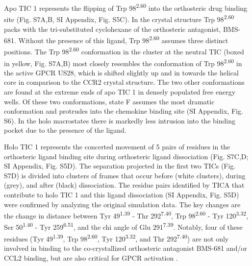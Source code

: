 \documentclass[9pt,twocolumn,twoside]{pnas-new}
\begin{document}
Apo TIC 1 represents the flipping of Trp 98\textsuperscript{2.60} into the orthosteric drug binding site (Fig. S7A,B, SI Appendix, Fig. S5C).
In the crystal structure Trp 98\textsuperscript{2.60} packs with the tri-substituted cyclohexane of the orthosteric antagonist, BMS-681\cite{Zheng2016}.
Without the presence of this ligand, Trp 98\textsuperscript{2.60} assumes three distinct positions.
The Trp 98\textsuperscript{2.60} conformation in the cluster at the neutral TIC (boxed in yellow, Fig. S7A,B) most closely resembles the conformation of Trp 98\textsuperscript{2.60} in the active GPCR US28, which is shifted slightly up and in towards the helical core in comparison to the CCR2 crystal structure.
The two other conformations are found at the extreme ends of apo TIC 1 in densely populated free energy wells.
Of these two conformations, state F assumes the most dramatic conformation and protrudes into the chemokine binding site (SI Appendix, Fig. S6).
In the holo macrostates there is markedly less intrusion into the binding pocket due to the presence of the ligand.

Holo TIC 1 represents the concerted movement of 5 pairs of residues in the orthosteric ligand binding site during orthosteric ligand dissociation (Fig. S7C,D; SI Appendix, Fig. S5D).
The separation projected in the first two TICs (Fig. S7D) is divided into clusters of frames that occur before (white clusters), during (grey), and after (black) dissociation.
The residue pairs identified by TICA that contribute to holo TIC 1 and this ligand dissociation (SI Appendix, Fig. S5D) were confirmed by analyzing the original simulation data.
The key changes are the change in distance between Tyr 49\textsuperscript{1.39} - Thr 292\textsuperscript{7.40}, Trp 98\textsuperscript{2.60} - Tyr 120\textsuperscript{3.32}, Ser 50\textsuperscript{1.40} - Tyr 259\textsuperscript{6.51}, and the chi angle of Glu 291\textsuperscript{7.39}.
Notably, four of these residues (Tyr 49\textsuperscript{1.39}, Trp 98\textsuperscript{2.60}, Tyr 120\textsuperscript{3.32}, and Thr 292\textsuperscript{7.40}) are not only involved in binding to the co-crystallized orthosteric antagonist BMS-681 and/or CCL2 binding, but are also critical for GPCR activation \cite{Berkhout2003, Hall2009}.
\end{document}
